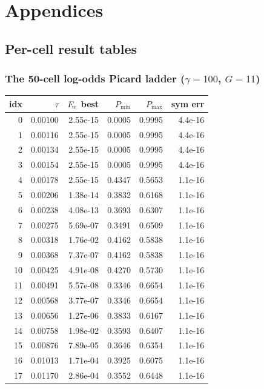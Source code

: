 
\appendix
\part*{Appendices}
\chapter{Per-cell result tables}

\section{The 50-cell log-odds Picard ladder ($\gamma=100$, $G=11$)}
{\small\begin{longtable}{rrrrrr}
\toprule
idx & $\tau$ & $F_{\!w}$ best & $P_{\min}$ & $P_{\max}$ & sym err \\
\midrule
\endhead
0 & 0.00100 & 2.55e-15 & 0.0005 & 0.9995 & 4.4e-16 \\
1 & 0.00116 & 2.55e-15 & 0.0005 & 0.9995 & 4.4e-16 \\
2 & 0.00134 & 2.55e-15 & 0.0005 & 0.9995 & 4.4e-16 \\
3 & 0.00154 & 2.55e-15 & 0.0005 & 0.9995 & 4.4e-16 \\
4 & 0.00178 & 2.55e-15 & 0.4347 & 0.5653 & 1.1e-16 \\
5 & 0.00206 & 1.38e-14 & 0.3832 & 0.6168 & 1.1e-16 \\
6 & 0.00238 & 4.08e-13 & 0.3693 & 0.6307 & 1.1e-16 \\
7 & 0.00275 & 5.69e-07 & 0.3491 & 0.6509 & 1.1e-16 \\
8 & 0.00318 & 1.76e-02 & 0.4162 & 0.5838 & 1.1e-16 \\
9 & 0.00368 & 7.37e-07 & 0.4162 & 0.5838 & 1.1e-16 \\
10 & 0.00425 & 4.91e-08 & 0.4270 & 0.5730 & 1.1e-16 \\
11 & 0.00491 & 5.57e-08 & 0.3346 & 0.6654 & 1.1e-16 \\
12 & 0.00568 & 3.77e-07 & 0.3346 & 0.6654 & 1.1e-16 \\
13 & 0.00656 & 1.27e-06 & 0.3833 & 0.6167 & 1.1e-16 \\
14 & 0.00758 & 1.98e-02 & 0.3593 & 0.6407 & 1.1e-16 \\
15 & 0.00876 & 7.89e-05 & 0.3646 & 0.6354 & 1.1e-16 \\
16 & 0.01013 & 1.71e-04 & 0.3925 & 0.6075 & 1.1e-16 \\
17 & 0.01170 & 2.86e-04 & 0.3552 & 0.6448 & 1.1e-16 \\

\end{longtable}}
